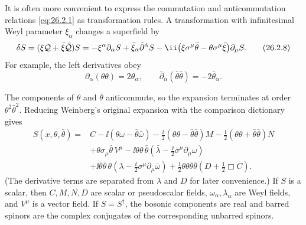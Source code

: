 It is often more convenient to express the commutation and anticommutation
relations \eqref{eq:26.2.1} as transformation rules.  A transformation
with infinitesimal Weyl parameter \(\xi_\alpha\) changes a superfield by
\begin{equation}
  \delta S=(\xi\SuperQ+\bar\xi\bar{\SuperQ})S
  =-\xi^\alpha\partial_\alpha S
   +\bar\xi_{\dot\alpha}\bar\partial^{\dot\alpha}S
   -\ii\bigl(\xi\sigma^\mu\bar\theta
     -\theta\sigma^\mu\bar\xi\bigr)\partial_\mu S .
  \tag{26.2.8}\label{eq:26.2.8}
\end{equation}
For example, the left derivatives obey
\begin{equation}
  \partial_\alpha(\theta\theta)=2\theta_\alpha,
  \qquad
  \bar\partial_{\dot\alpha}(\bar\theta\bar\theta)
  =-2\bar\theta_{\dot\alpha}.
  \tag{26.2.9}\label{eq:26.2.9}
\end{equation}

The components of \(\theta\) and \(\bar\theta\) anticommute, so the
expansion terminates at order \(\theta^2\bar\theta^2\).  Reducing
Weinberg's original expansion with the comparison dictionary gives
\begin{equation}
  \begin{aligned}
  S(x,\theta,\bar\theta)={}&C
  -\ii(\theta\omega-\bar\theta\bar\omega)
  -\frac{\ii}{2}(\theta\theta-\bar\theta\bar\theta)M
  -\frac12(\theta\theta+\bar\theta\bar\theta)N\\
  &+\theta\sigma_\mu\bar\theta\,V^\mu
  -\ii\theta\theta\,
    \bar\theta\left(\bar\lambda
      -\frac{\ii}{2}\bar\sigma^\mu\partial_\mu\omega\right)\\
  &+\ii\bar\theta\bar\theta\,
    \theta\left(\lambda
      -\frac{\ii}{2}\sigma^\mu\partial_\mu\bar\omega\right)
  +\frac12\theta\theta\bar\theta\bar\theta
    \left(D+\frac12\Box C\right).
  \end{aligned}
  \tag{26.2.10}\label{eq:26.2.10}
\end{equation}
(The derivative terms are separated from \(\lambda\) and \(D\) for later
convenience.) If \(S\) is a scalar, then \(C,M,N,D\) are scalar or
pseudoscalar fields, \(\omega_\alpha,\lambda_\alpha\) are Weyl fields, and
\(V^\mu\) is a vector field.  If \(S=S^\dagger\), the bosonic components
are real and barred spinors are the complex conjugates of the corresponding
unbarred spinors.

